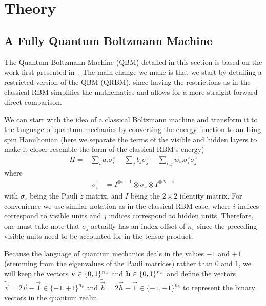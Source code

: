 \section{Theory}
\subsection{A Fully Quantum Boltzmann Machine}
The Quantum Boltzmann Machine (QBM) detailed in this section is based on the work first presented in~\cite{amin_2018}.
The main change we make is that we start by detailing a restricted version of the QBM (QRBM), since having the restrictions as in the classical RBM simplifies the mathematics and allows for a more straight forward direct comparison.

We can start with the idea of a classical Boltzmann machine and transform it to the language of quantum mechanics by converting the energy function to an Ising spin Hamiltonian (here we separate the terms of the visible and hidden layers to make it closer resemble the form of the classical RBM's energy)
\begin{align}
    H = -\sum_i a_i \sigma_i^z - \sum_j b_j \sigma_j^z - \sum_{i,j} w_{ij} \sigma_i^z \sigma_j^z
\end{align}
where
\begin{align}
    \sigma_i^z
        &= I^{\otimes i-1} \otimes \sigma_z \otimes I^{\otimes N-i}
\end{align}
with \( \sigma_z \) being the Pauli \( z \) matrix, and \( I \) being the \( 2 \times 2 \) identity matrix.
For convenience we use similar notation as in the classical RBM case, where \( i \) indices correspond to visible units and \( j \) indices correspond to hidden units.
Therefore, one must take note that \( \sigma_j \) actually has an index offset of \( n_v \) since the preceding visible units need to be accounted for in the tensor product.

Because the language of quantum mechanics deals in the values \( -1 \) and \( +1 \) (stemming from the eigenvalues of the Pauli matrices) rather than \( 0 \) and \( 1 \), we will keep the vectors \( \mathbf{v} \in \{0,1\}^{n_v} \) and \( \mathbf{h} \in \{0,1\}^{n_h} \) and define the vectors \( \tilde{\vec{v}} = 2\vec{v} - \vec{1} \in \{-1,+1\}^{n_v} \) and \( \tilde{\vec{h}} = 2\vec{h} - \vec{1} \in \{-1,+1\}^{n_h} \) to represent the binary vectors in the quantum realm.

